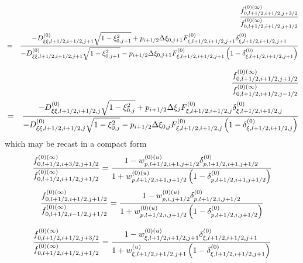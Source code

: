\begin{eqnarray}
&&\frac{f_{0,l+1/2,i+1/2,j+3/2}^{\left( 0\right) (\infty )}}{%
f_{0,l+1/2,i+1/2,j+1/2}^{\left( 0\right) (\infty )}}  \nonumber \\
&=&\frac{-D_{\xi \xi ,l+1/2,i+1/2,j+1}^{\left( 0\right) }\sqrt{1-\xi
_{0,j+1}^{2}}+p_{i+1/2}\Delta \xi _{0,j+1}F_{\xi ,l+1/2,i+1/2,j+1}^{\left(
0\right) }\delta _{\xi ,l+1/2,i+1/2,j+1}^{\left( 0\right) }}{-D_{\xi \xi
,l+1/2,i+1/2,j+1}^{\left( 0\right) }\sqrt{1-\xi _{0,j+1}^{2}}%
-p_{i+1/2}\Delta \xi _{0,j+1}F_{\xi ,l+1/2,i+1/2,j+1}^{\left( 0\right)
}\left( 1-\delta _{\xi ,l+1/2,i+1/2,j+1}^{\left( 0\right) }\right) }
\end{eqnarray}

\begin{eqnarray}
&&\frac{f_{0,l+1/2,i+1/2,j+1/2}^{\left( 0\right) (\infty )}}{%
f_{0,l+1/2,i+1/2,j-1/2}^{\left( 0\right) (\infty )}}  \nonumber \\
&=&\frac{-D_{\xi \xi ,l+1/2,i+1/2,j}^{\left( 0\right) }\sqrt{1-\xi _{0,j}^{2}%
}+p_{i+1/2}\Delta \xi _{j}F_{\xi ,l+1/2,i+1/2,j}^{\left( 0\right) }\delta
_{\xi ,l+1/2,i+1/2,j}^{\left( 0\right) }}{-D_{\xi \xi
,l+1/2,i+1/2,j}^{\left( 0\right) }\sqrt{1-\xi _{0,j}^{2}}-p_{i+1/2}\Delta
\xi _{0,j}F_{\xi ,l+1/2,i+1/2,j}^{\left( 0\right) }\left( 1-\delta _{\xi
,l+1/2,i+1/2,j}^{\left( 0\right) }\right) }
\end{eqnarray}
which may be recast in a compact form
\begin{equation}
\frac{f_{0,l+1/2,i+3/2,j+1/2}^{\left( 0\right) (\infty )}}{%
f_{0,l+1/2,i+1/2,j+1/2}^{\left( 0\right) (\infty )}}=\frac{%
1-w_{p,l+1/2,i+1,j+1/2}^{\left( 0\right) (u)}\delta
_{p,l+1/2,i+1,j+1/2}^{\left( 0\right) }}{1+w_{p,l+1/2,i+1,j+1/2}^{\left(
0\right) (u)}\left( 1-\delta _{p,l+1/2,i+1,j+1/2}^{\left( 0\right) }\right) }
\end{equation}
\begin{equation}
\frac{f_{0,l+1/2,i+1/2,j+1/2}^{\left( 0\right) (\infty )}}{%
f_{0,l+1/2,i-1/2,j+1/2}^{\left( 0\right) (\infty )}}=\frac{%
1-w_{p,i,j+1/2}^{\left( 0\right) (u)}\delta _{p,l+1/2,i,j+1/2}^{\left(
0\right) }}{1+w_{p,l+1/2,i,j+1/2}^{\left( 0\right) (u)}\left( 1-\delta
_{p,l+1/2,i,j+1/2}^{\left( 0\right) }\right) }
\end{equation}

\begin{equation}
\frac{f_{0,l+1/2,i+1/2,j+3/2}^{\left( 0\right) (\infty )}}{%
f_{0,l+1/2,i+1/2,j+1/2}^{\left( 0\right) (\infty )}}=\frac{1-w_{\xi
,l+1/2,i+1/2,j+1}^{\left( 0\right) (u)}\delta _{\xi
,l+1/2,i+1/2,j+1}^{\left( 0\right) }}{1+w_{\xi ,l+1/2,i+1/2,j+1}^{(u)}\left(
1-\delta _{\xi ,l+1/2,i+1/2,j+1}^{\left( 0\right) }\right) }
\end{equation}

